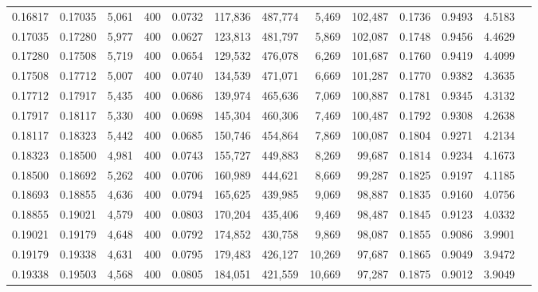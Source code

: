 \begin{tabular}{rrrrrrrrrrrrr}
0.16817 & 0.17035 &  5,061 & 400 &                                     0.0732 & 117,836 & 487,774 &   5,469 & 102,487 & 0.1736 & 0.9493 & 4.5183 \\
0.17035 & 0.17280 &  5,977 & 400 &                                     0.0627 & 123,813 & 481,797 &   5,869 & 102,087 & 0.1748 & 0.9456 & 4.4629 \\
0.17280 & 0.17508 &  5,719 & 400 &                                     0.0654 & 129,532 & 476,078 &   6,269 & 101,687 & 0.1760 & 0.9419 & 4.4099 \\
0.17508 & 0.17712 &  5,007 & 400 &                                     0.0740 & 134,539 & 471,071 &   6,669 & 101,287 & 0.1770 & 0.9382 & 4.3635 \\
0.17712 & 0.17917 &  5,435 & 400 &                                     0.0686 & 139,974 & 465,636 &   7,069 & 100,887 & 0.1781 & 0.9345 & 4.3132 \\
0.17917 & 0.18117 &  5,330 & 400 &                                     0.0698 & 145,304 & 460,306 &   7,469 & 100,487 & 0.1792 & 0.9308 & 4.2638 \\
0.18117 & 0.18323 &  5,442 & 400 &                                     0.0685 & 150,746 & 454,864 &   7,869 & 100,087 & 0.1804 & 0.9271 & 4.2134 \\
0.18323 & 0.18500 &  4,981 & 400 &                                     0.0743 & 155,727 & 449,883 &   8,269 &  99,687 & 0.1814 & 0.9234 & 4.1673 \\
0.18500 & 0.18692 &  5,262 & 400 &                                     0.0706 & 160,989 & 444,621 &   8,669 &  99,287 & 0.1825 & 0.9197 & 4.1185 \\
0.18693 & 0.18855 &  4,636 & 400 &                                     0.0794 & 165,625 & 439,985 &   9,069 &  98,887 & 0.1835 & 0.9160 & 4.0756 \\
0.18855 & 0.19021 &  4,579 & 400 &                                     0.0803 & 170,204 & 435,406 &   9,469 &  98,487 & 0.1845 & 0.9123 & 4.0332 \\
0.19021 & 0.19179 &  4,648 & 400 &                                     0.0792 & 174,852 & 430,758 &   9,869 &  98,087 & 0.1855 & 0.9086 & 3.9901 \\
0.19179 & 0.19338 &  4,631 & 400 &                                     0.0795 & 179,483 & 426,127 &  10,269 &  97,687 & 0.1865 & 0.9049 & 3.9472 \\
0.19338 & 0.19503 &  4,568 & 400 &                                     0.0805 & 184,051 & 421,559 &  10,669 &  97,287 & 0.1875 & 0.9012 & 3.9049 \\

\end{tabular}
